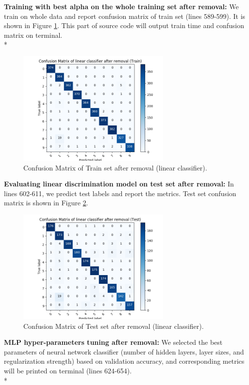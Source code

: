 \documentclass[12pt]{article}
\begin{document}
\textbf{Training with best alpha on the whole training set after removal:} We train on whole data and report confusion matrix of train set (lines 589-599). It is shown in Figure \ref{fig:resgdtrain}. This part of source code will output train time and confusion matrix on terminal.\\*
\begin{figure}[ht] 
	\begin{center}
		\includegraphics[width=3in]{resgdtrain.png}
		\caption{Confusion Matrix of Train set after removal (linear classifier).}
		\label{fig:resgdtrain}
	\end{center}
\end{figure} 
\textbf{Evaluating linear discrimination model on test set after removal:} In lines 602-611, we predict test labels and report the metrics. Test set confusion matrix is shown in Figure \ref{fig:resgdtest}.
\begin{figure}[ht] 
	\begin{center}
		\includegraphics[width=3in]{resgdtest.png}
		\caption{Confusion Matrix of Test set after removal (linear classifier).}
		\label{fig:resgdtest}
	\end{center}
\end{figure} 
\newpage
\textbf{MLP hyper-parameters tuning after removal:} We selected the best parameters of neural network classifier (number of hidden layers, layer sizes, and regularization strength) based on validation accuracy, and corresponding metrics will be printed on terminal (lines 624-654).\\*
\end{document}
